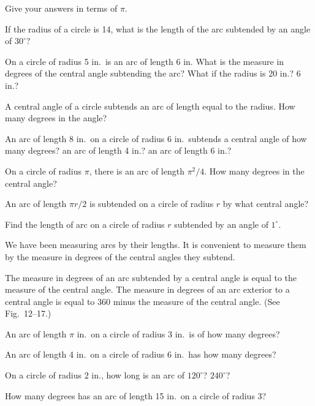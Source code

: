 \documentclass[11pt]{book}
\begin{document}
\FIGXIISIXTEEN

\begin{center}Give your answers in terms of $\pi$.\end{center}
\nopagebreak
\begin{exercisecols}
\begin{exlist}
\item If the radius of a circle is 14, what is the length of the arc subtended
      by an angle of $30^\circ$?
\item On a circle of radius 5 in.\ is an arc of length 6 in. What is the measure
      in degrees of the central angle subtending the arc? What if the radius is
      20 in.? 6 in.?
\item A central angle of a circle subtends an arc of length equal to the radius.
      How many degrees in the angle?
\item An arc of length 8 in.\ on a circle of radius 6 in.\ subtends a central
      angle of how many degrees? an arc of length 4 in.? an arc of length
      6 in.?
\item On a circle of radius $\pi$, there is an arc of length $\pi^2/4$. How many
      degrees in the central angle?
\item An arc of length $\pi r/2$ is subtended on a circle of radius $r$ by what
      central angle?
\item Find the length of arc on a circle of radius $r$ subtended by an angle of
      $1^\circ$.
\end{exlist}
\end{exercisecols}

We have been measuring arcs by their lengths. It is convenient to measure them
by the measure in degrees of the central angles they subtend.

\begin{definition}
The measure in degrees of an arc subtended by a central angle is equal to the
measure of the central angle. The measure in degrees of an arc exterior to a
central angle is equal to 360 minus the measure of the central angle. (See
Fig.~12--17.)
\end{definition}

\FIGXIISEVENTEENEIGHTEEN

\begin{exercisecols}
\begin{exlist}
\item An arc of length $\pi$ in.\ on a circle of radius 3 in.\ is of how many
      degrees?
\item An arc of length 4 in.\ on a circle of radius 6 in.\ has how many degrees?
\item On a circle of radius 2 in., how long is an arc of $120^\circ$?
      $240^\circ$?
\item How many degrees has an arc of length 15 in.\ on a circle of radius 3?
\end{exlist}
\end{exercisecols}
\end{document}
